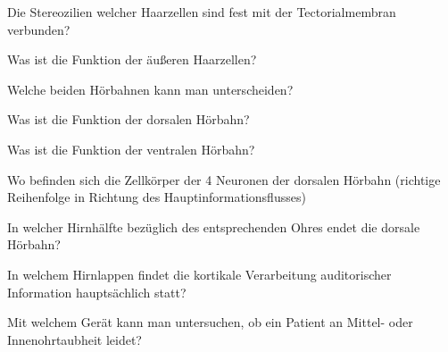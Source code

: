 \documentclass[10pt, a4paper]{exam}
\begin{document}
\begin{questions}
\begin{solution}
  \end{solution}

  \question Die Stereozilien welcher Haarzellen sind fest mit der Tectorialmembran verbunden?
  \begin{solution}

  \end{solution}

  \question Was ist die Funktion der äußeren Haarzellen?
  \begin{solution}

  \end{solution}

  \question Welche beiden Hörbahnen kann man unterscheiden?
  \begin{solution}

  \end{solution}

  \question Was ist die Funktion der dorsalen Hörbahn?
  \begin{solution}

  \end{solution}

  \question Was ist die Funktion der ventralen Hörbahn?
  \begin{solution}

  \end{solution}

  \question Wo befinden sich die Zellkörper der 4 Neuronen der dorsalen Hörbahn (richtige Reihenfolge in Richtung des Hauptinformationsflusses)
  \begin{solution}

  \end{solution}

  \question In welcher Hirnhälfte bezüglich des entsprechenden Ohres endet die dorsale Hörbahn?
  \begin{solution}

  \end{solution}

  \question In welchem Hirnlappen findet die kortikale Verarbeitung auditorischer Information hauptsächlich statt?
  \begin{solution}

  \end{solution}

  \question Mit welchem Gerät kann man untersuchen, ob ein Patient an Mittel- oder Innenohrtaubheit leidet?
  \begin{solution}

  \end{solution}


\end{questions}
\end{document}
